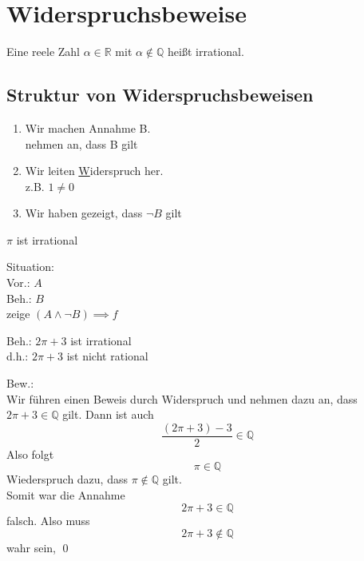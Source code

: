 \documentclass{myclass}
\begin{document}
\section{Widerspruchsbeweise}
\begin{definition}
	\label{def:IrrationaleZahlen}
	Eine reele Zahl $ \alpha \in \mathbb{R} $ mit $ \alpha \notin \mathbb{Q} $ heißt irrational.
\end{definition}

\subsection{Struktur von Widerspruchsbeweisen}
\begin{enumerate}
	\item Wir machen Annahme B.\\
		nehmen an, dass B gilt
	\item Wir leiten \underline Widerspruch her.\\
		z.B. $ 1 \neq 0 $\\
	\item Wir haben gezeigt, dass $ \neg B $ gilt
\end{enumerate}

\begin{subtheorem}
	\label{theorem:PiIstIrrational}
	$ \pi $ ist irrational
\end{subtheorem}
\begin{subproof}
	Situation:\\
	Vor.: $A$ \\
	Beh.: $B$ \\
	zeige $ ( A \wedge \neg B ) \implies f $\par
	Beh.: $ 2 \pi + 3 $ ist irrational\\
	d.h.: $ 2 \pi + 3 $ ist nicht rational\par
	Bew.:\\
	Wir führen einen Beweis durch Widerspruch und nehmen dazu an, dass $ 2 \pi + 3 \in \mathbb{Q} $ gilt. Dann ist auch
	\[ \frac{ ( 2 \pi + 3 ) - 3 }{ 2 } \in \mathbb{Q} \]
	Also folgt
	\[ \pi \in \mathbb{Q} \]
	Wiederspruch dazu, dass $ \pi \notin \mathbb{Q} $ gilt.\\
	Somit war die Annahme
	\[ 2 \pi + 3 \in \mathbb{Q} \]
	falsch. Also muss
	\[ 2 \pi + 3 \notin \mathbb{Q} \]
	wahr sein, \qed
\end{subproof}
\end{document}
